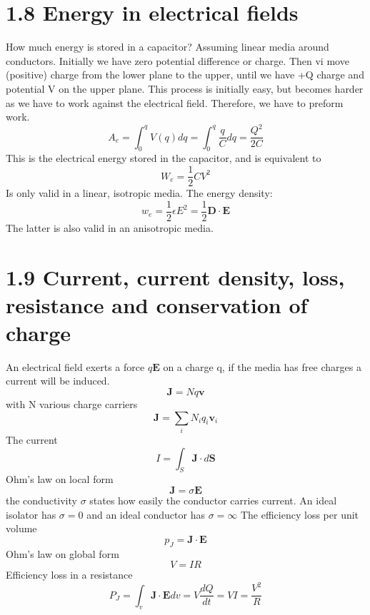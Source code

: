 \documentclass[
12pt, reprint, aip, onecolumn, notitlepage
]{revtex4-1}
\begin{document}
\section{1.8 Energy in electrical fields}
How much energy is stored in a capacitor?
Assuming linear media around conductors. Initially we have zero potential difference or charge. Then vi move (positive) charge from the lower plane to the upper, until we have +Q charge and potential V on the upper plane. This process is initially easy, but becomes harder as we have to work against the electrical field. Therefore, we have to preform work.
\begin{equation}
	A_e = \int_{0}^{q}V(q)dq =\int_{0}^{q}\dfrac{q}{C}dq  = \dfrac{Q^2}{2C}
\end{equation}
This is the electrical energy stored in the capacitor, and is equivalent to 
\begin{equation}
	W_e = \dfrac{1}{2}CV^2
\end{equation}
Is only valid in a linear, isotropic media. The energy density:
\begin{equation}
	w_e = \dfrac{1}{2}\epsilon E^2 = \dfrac{1}{2}\mathbf{D}\cdot \mathbf{E}
\end{equation}
The latter is also valid in an anisotropic media. 

\section{1.9 Current, current density, loss, resistance and conservation of charge}
An electrical field exerts a force $q\mathbf{E}$ on a charge q, if the media has free charges a current will be induced. 
\begin{equation}
	\mathbf{J} = Nq\mathbf{v}
\end{equation}
with N various charge carriers
\begin{equation}
\mathbf{J} = \sum_i N_iq_i\mathbf{v}_i
\end{equation}
The current 
\begin{equation}
	I = \int_S \mathbf{J}\cdot d\mathbf{S}
\end{equation}
Ohm's law on local form
\begin{equation}
	\mathbf{J} = \sigma\mathbf{E}
\end{equation}
the conductivity $\sigma$ states how easily the conductor carries current. An ideal isolator has $\sigma = 0$ and an ideal conductor has $\sigma = \infty$
The efficiency loss per unit volume
\begin{equation}
	p_J = \mathbf{J}\cdot\mathbf{E}
\end{equation} 
Ohm's law on global form
\begin{equation}
	V = IR
\end{equation}
Efficiency loss in a resistance
\begin{equation}
	P_J = \int_v\mathbf{J}\cdot\mathbf{E}dv = V\dfrac{dQ}{dt}=VI = \dfrac{V^2}{R}
\end{equation} 
\end{document}
